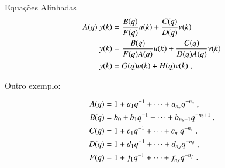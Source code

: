 Equações Alinhadas
\begin{eqnarray} \label{eq:modelogeralident}
\begin{aligned}
	\noindent 
A(q) \ y(k)&=\dfrac{B(q)}{F(q)}u(k)+\dfrac{C(q)}{D(q)}\nu(k)\\
y(k)&=\dfrac{B(q)}{F(q)A(q)}u(k)+\dfrac{C(q)}{D(q)A(q)}\nu(k)\\
y(k)&=G(q)u(k)+H(q)\nu(k) \ ,
\end{aligned}
\end{eqnarray}

Outro exemplo:

\begin{eqnarray} \label{eq:polinomiosmodelogeralident}
\begin{aligned}
	\noindent 
A(q)&=1+a_1q^{-1}+\cdots+a_{n_a}q^{-n_a}\ ,\\
B(q)&=b_0+b_1q^{-1}+\cdots+b_{n_b-1}q^{-n_b+1}\ ,\\
C(q)&=1+c_1q^{-1}+\cdots+c_{n_c}q^{-n_c}\ ,\\
D(q)&=1+d_1q^{-1}+\cdots+d_{n_d}q^{-n_d}\ ,\\
F(q)&=1+f_1q^{-1}+\cdots+f_{n_f}q^{-n_f}\ .
\end{aligned}
\end{eqnarray}

